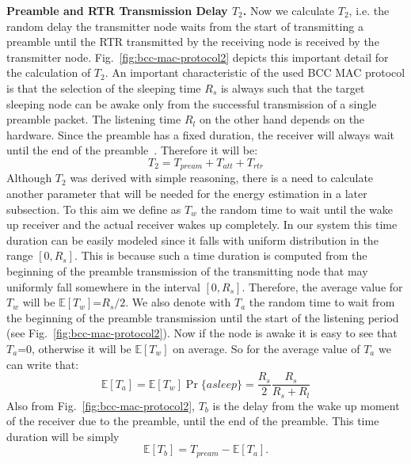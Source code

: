 \documentclass[10pt]{IEEEtran}
\newcounter{section:outage-analysis}
\begin{document}
\textbf{Preamble and RTR Transmission Delay $T_2$.} Now we calculate $T_2$, i.e. the random delay the transmitter node waits from the start of transmitting a preamble until the RTR transmitted by the receiving node is received by the transmitter node. Fig.~\ref{fig:bcc-mac-protocol2} depicts this important detail for the calculation of $T_2$. An important characteristic of the used BCC MAC protocol is that the selection of the sleeping time $R_s$ is always such that the target sleeping node can be awake only from the successful transmission of a single preamble packet. The listening time $R_l$ on the other hand depends on the hardware. Since the preamble has a fixed duration, the receiver will always wait until the end of the preamble~\cite{buettner06}. Therefore it will be:
\begin{equation}\label{T_2}
T_2=T_{pream}+T_{att}+T_{rtr}
\end{equation}
Although $T_2$ was derived with simple reasoning, there is a need to calculate another parameter that will be needed for the energy estimation in a later subsection. To this aim we define as $T_w$ the random time to wait until the wake up receiver and the actual receiver wakes up completely. In our system this time duration can be easily modeled since it falls with uniform distribution in the range $[0,R_s]$. This is because such a time duration is computed from the beginning of the preamble transmission of the transmitting node that may uniformly fall somewhere in the interval $[0,R_s]$. Therefore, the average value for $T_w$ will be $\mathbb{E}[T_w]$=$R_s/2$. We also denote with $T_a$ the random time to wait from the beginning of the preamble transmission until the start of the listening period (see Fig.~\ref{fig:bcc-mac-protocol2}). Now if the node is awake it is easy to see that $T_a$=$0$, otherwise it will be $\mathbb{E}[T_w]$ on average. So for the average value of $T_a$ we can write that:
\begin{equation}
\mathbb{E}[T_a]=\mathbb{E}[T_w] \Pr\{asleep\}=\frac{R_s}{2}\frac{R_s}{R_s+R_l}
\end{equation}
Also from Fig.~\ref{fig:bcc-mac-protocol2}, $T_b$ is the delay from the wake up moment of the receiver due to the preamble, until the end of the preamble. This time duration will be simply
\begin{equation}
\mathbb{E}[T_b]=T_{pream}-\mathbb{E}[T_a].
\end{equation}
\end{document}
